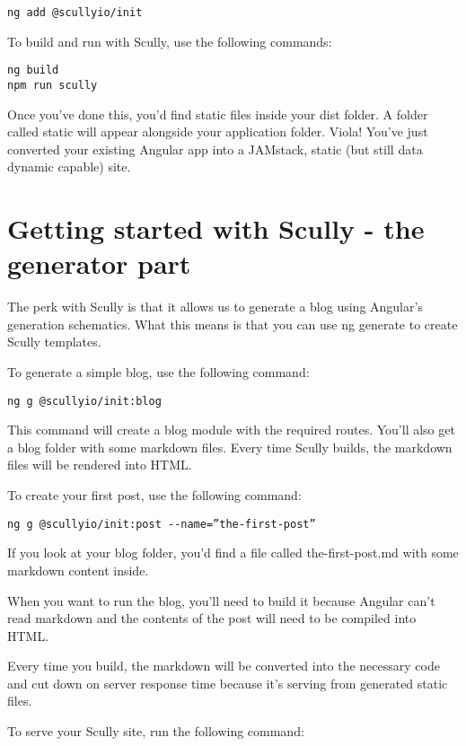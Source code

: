 \begin{verbatim}
ng add @scullyio/init
\end{verbatim}

To build and run with Scully, use the following commands:

\begin{verbatim}
ng build
npm run scully
\end{verbatim}

Once you’ve done this, you’d find static files inside your dist folder. A folder called static will appear alongside your application folder. 
Viola! You’ve just converted your existing Angular app into a JAMstack, static (but still data dynamic capable) site.

\section{Getting started with Scully - the generator part}
The perk with Scully is that it allows us to generate a blog using Angular’s generation schematics. What this means is that you can use ng generate to create Scully templates.

To generate a simple blog, use the following command:

\begin{verbatim}
ng g @scullyio/init:blog
\end{verbatim}

This command will create a blog module with the required routes. You’ll also get a blog folder with some markdown files. Every time Scully builds, the markdown files will be rendered into HTML.

To create your first post, use the following command:

\begin{verbatim}
ng g @scullyio/init:post --name=”the-first-post”
\end{verbatim}

If you look at your blog folder, you’d find a file called the-first-post.md with some markdown content inside.

When you want to run the blog, you’ll need to build it because Angular can’t read markdown and the contents of the post will need to be compiled into HTML.

Every time you build, the markdown will be converted into the necessary code and cut down on server response time because it’s serving from generated static files.

To serve your Scully site, run the following command:

